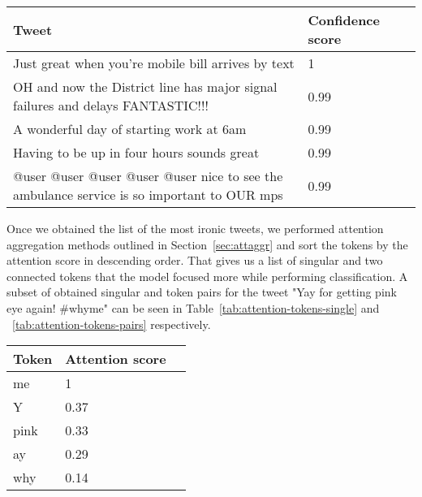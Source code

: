 \documentclass[10pt, a4paper]{article}
\begin{document}
\begin{table*}
\caption{Most Ironic Tweets in the Test Set}
\label{tab:most-ironic-test}
\begin{center}
\begin{tabular}{llr}
\toprule
Tweet & Confidence score\\
\midrule
Just great when you're mobile bill arrives by text                                          & 1 \\
OH and now the District line has major signal failures and delays FANTASTIC!!!              & 0.99 \\
A wonderful day of starting work at 6am                                                     & 0.99 \\
Having to be up in four hours sounds great                                                  & 0.99 \\
@user @user @user @user @user  nice to see the ambulance service is so important to OUR mps & 0.99 \\
\bottomrule
\end{tabular}
\end{center}
\end{table*}

Once we obtained the list of the most ironic tweets, we performed attention aggregation methods outlined in Section~\ref{sec:attaggr} and sort the tokens by the attention score in descending order.
That gives us a list of singular and two connected tokens that the model focused more while performing classification.
A subset of obtained singular and token pairs for the tweet "Yay for getting pink eye again!  \#whyme" can be seen in Table~\ref{tab:attention-tokens-single} and ~\ref{tab:attention-tokens-pairs} respectively.

\begin{table*}
\caption{Single Tokens With Highest Attention}
\label{tab:attention-tokens-single}
\begin{center}
\begin{tabular}{llr}
\toprule
Token & Attention score\\
\midrule
me    & 1 \\
Y     & 0.37 \\
pink  & 0.33 \\
ay    & 0.29 \\
why   & 0.14 \\
\bottomrule
\end{tabular}
\end{center}
\end{table*}
\end{document}
